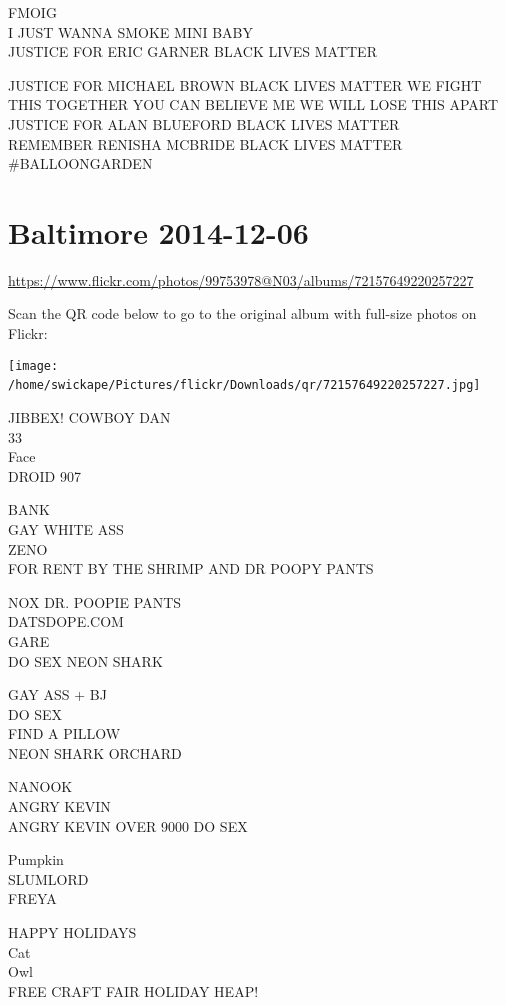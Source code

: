 \documentclass[10pt,letterpaper]{article}
\begin{document}
FMOIG\\
I JUST WANNA SMOKE MINI BABY\\
JUSTICE FOR ERIC GARNER BLACK LIVES MATTER

JUSTICE FOR MICHAEL BROWN BLACK LIVES MATTER WE FIGHT THIS TOGETHER YOU CAN BELIEVE ME WE WILL LOSE THIS APART\\
JUSTICE FOR ALAN BLUEFORD BLACK LIVES MATTER\\
REMEMBER RENISHA MCBRIDE BLACK LIVES MATTER\\
\#BALLOONGARDEN
\

\section*{Baltimore 2014-12-06}

\url{https://www.flickr.com/photos/99753978@N03/albums/72157649220257227}

Scan the QR code below to go to the original album with full-size photos on Flickr:

\texttt{[image: /home/swickape/Pictures/flickr/Downloads/qr/72157649220257227.jpg]}
\

JIBBEX! COWBOY DAN\\
33\\
Face\\
DROID 907

BANK\\
GAY WHITE ASS\\
ZENO\\
FOR RENT BY THE SHRIMP AND DR POOPY PANTS

NOX DR. POOPIE PANTS\\
DATSDOPE.COM\\
GARE\\
DO SEX NEON SHARK

GAY ASS + BJ\\
DO SEX\\
FIND A PILLOW\\
NEON SHARK ORCHARD

NANOOK\\
ANGRY KEVIN\\
ANGRY KEVIN OVER 9000 DO SEX

Pumpkin\\
SLUMLORD\\
FREYA

HAPPY HOLIDAYS\\
Cat\\
Owl\\
FREE CRAFT FAIR HOLIDAY HEAP!
\end{document}
